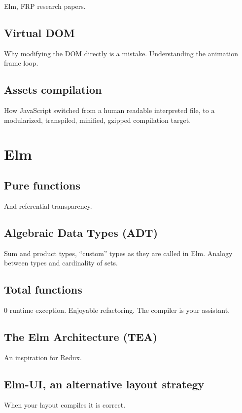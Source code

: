 Elm, FRP research papers.

\subsection{Virtual DOM}%
\label{sub:virtual_dom}

Why modifying the DOM directly is a mistake.
Understanding the animation frame loop.

\subsection{Assets compilation}%
\label{sub:assets_compilation}

How JavaScript switched from a human readable interpreted file,
to a modularized, transpiled, minified, gzipped compilation target.

\section{Elm}%
\label{sec:elm}

\subsection{Pure functions}%
\label{sub:pure_functions}

And referential transparency.

\subsection{Algebraic Data Types (ADT)}%
\label{sub:algebraic_data_types_adt_}

Sum and product types, ``custom'' types as they are called in Elm.
Analogy between types and cardinality of sets.

\subsection{Total functions}%
\label{sub:total_functions}

0 runtime exception.
Enjoyable refactoring.
The compiler is your assistant.

\subsection{The Elm Architecture (TEA)}%
\label{sub:the_elm_architecture_tea_}

An inspiration for Redux.

\subsection{Elm-UI, an alternative layout strategy}%
\label{sub:elm_ui_an_alternative_layout_strategy}

When your layout compiles it is correct.
